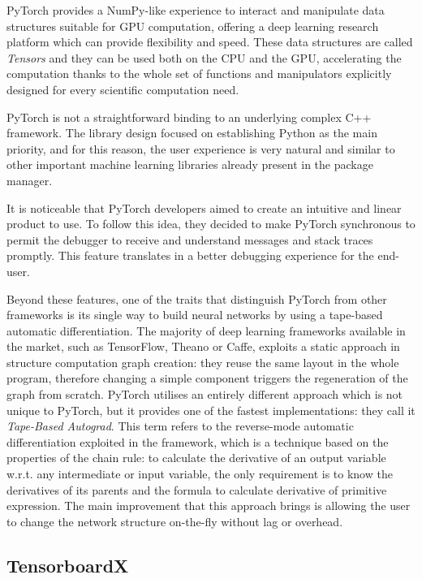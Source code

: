 PyTorch provides a NumPy-like experience to interact and manipulate data structures suitable for GPU computation, offering a deep learning research platform which can provide flexibility and speed.
These data structures are called \textit{Tensors} and they can be used both on the CPU and the GPU, accelerating the computation thanks to the whole set of functions and manipulators explicitly designed for every scientific computation need.

PyTorch is not a straightforward binding to an underlying complex C++ framework.
The library design focused on establishing Python as the main priority, and for this reason, the user experience is very natural and similar to other important machine learning libraries already present in the package manager.

It is noticeable that PyTorch developers aimed to create an intuitive and linear product to use.
To follow this idea, they decided to make PyTorch synchronous to permit the debugger to receive and understand messages and stack traces promptly.
This feature translates in a better debugging experience for the end-user.

Beyond these features, one of the traits that distinguish PyTorch from other frameworks is its single way to build neural networks by using a tape-based automatic differentiation.
The majority of deep learning frameworks available in the market, such as TensorFlow, Theano or Caffe, exploits a static approach in structure computation graph creation: they reuse the same layout in the whole program, therefore changing a simple component triggers the regeneration of the graph from scratch.
PyTorch utilises an entirely different approach which is not unique to PyTorch, but it provides one of the fastest implementations: they call it \textit{Tape-Based Autograd}.
This term refers to the reverse-mode automatic differentiation exploited in the framework, which is a technique based on the properties of the chain rule: to calculate the derivative of an output variable w.r.t. any intermediate or input variable, the only requirement is to know the derivatives of its parents and the formula to calculate derivative of primitive expression.
The main improvement that this approach brings is allowing the user to change the network structure on-the-fly without lag or overhead.

\subsection{TensorboardX}

